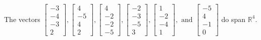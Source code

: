 \begin{exercise}
\begin{exerciseStatement}
  \end{exerciseStatement}
  \begin{exerciseAnswer}
   The vectors \(\left[\begin{array}{r}
-3 \\
-4 \\
-3 \\
2
\end{array}\right] , \left[\begin{array}{r}
4 \\
-5 \\
4 \\
2
\end{array}\right] , \left[\begin{array}{r}
4 \\
-2 \\
-2 \\
-5
\end{array}\right] , \left[\begin{array}{r}
-2 \\
-3 \\
-5 \\
3
\end{array}\right] , \left[\begin{array}{r}
1 \\
-2 \\
-4 \\
1
\end{array}\right] , \text{ and } \left[\begin{array}{r}
-5 \\
4 \\
-1 \\
0
\end{array}\right]\) 
  	 do  
	span \(\mathbb{R}^4\).
  


  \end{exerciseAnswer}
\end{exercise}
